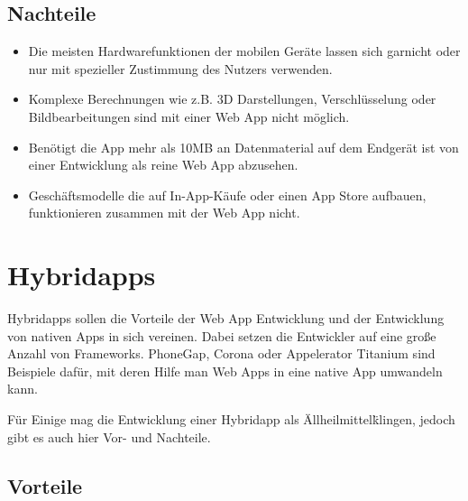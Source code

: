\subsection{Nachteile}
\label{sec:webapp:cons}

\begin{itemize}

	\item Die meisten Hardwarefunktionen der mobilen Geräte lassen sich garnicht oder nur mit spezieller Zustimmung des Nutzers verwenden.\cite[]{WEB:APPEV:2014}

	\item Komplexe Berechnungen wie z.B. 3D Darstellungen, Verschlüsselung oder Bildbearbeitungen sind mit einer Web App nicht möglich.\cite[]{WEB:APPEV:2014}

	\item Benötigt die App mehr als 10MB an Datenmaterial auf dem Endgerät ist von einer Entwicklung als reine Web App abzusehen.\cite[]{WEB:APPEV:2014}

	\item Geschäftsmodelle die auf In-App-Käufe oder einen App Store aufbauen, funktionieren zusammen mit der Web App nicht.\cite[]{WEB:APPEV:2014}

\end{itemize}

\section{Hybridapps}
\label{sec:intro:hybrid}

Hybridapps sollen die Vorteile der Web App Entwicklung und der Entwicklung von nativen Apps in sich vereinen. Dabei setzen die Entwickler auf eine große Anzahl von Frameworks. PhoneGap, Corona oder Appelerator Titanium sind Beispiele dafür, mit deren Hilfe man Web Apps in eine native App umwandeln kann.

Für Einige mag die Entwicklung einer Hybridapp als \"Allheilmittel\" klingen, jedoch gibt es auch hier Vor- und Nachteile.\cite[]{WEB:APPEV:2014}

\subsection{Vorteile}
\label{sec:hybrid:pros}

